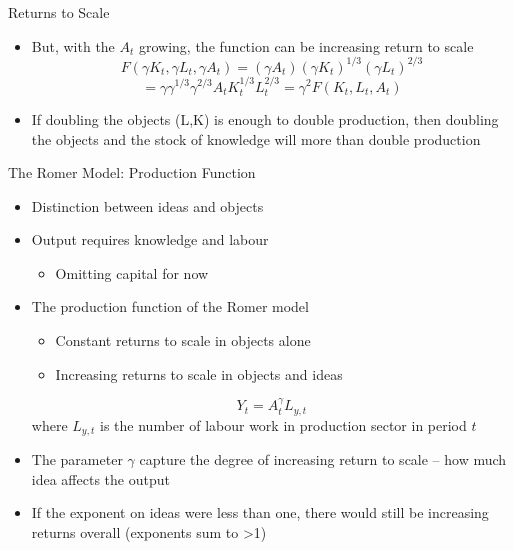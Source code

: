 \documentclass[aspectratio=1610]{beamer}
\begin{document}
\begin{frame}[wide]{Returns to Scale}
	\begin{itemize}
		\item But, with the $A_t$ growing, the function can be increasing return to scale
		\vspace{1mm}
		\[F(\gamma K_t,\gamma L_t, \gamma A_t) = (\gamma A_t) (\gamma K_t)^{1/3} (\gamma L_t)^{2/3}\]
		\[ = \gamma \gamma^{1/3} \gamma^{2/3} A_tK_t^{1/3}L_t^{2/3} = \gamma^2 F(K_t,L_t, A_t)  \]
		\vspace{1mm}
		\item If doubling the objects (L,K) is enough to double production, then doubling the objects and the stock of knowledge will more than double production
	\end{itemize}
\end{frame}

\begin{frame}[wide]{The Romer Model: Production Function}
	\begin{itemize}
		\item Distinction between ideas and objects
		\item Output requires knowledge and labour
		\begin{itemize}
			\item Omitting capital for now
		\end{itemize}
		\item The production function of the Romer model
		\begin{itemize}
			\item Constant returns to scale in objects alone
			\item Increasing returns to scale in objects and ideas
		\end{itemize}
		\vspace{2mm}
		\[Y_t = 		A_t^\gamma L_{y,t}\]
		where $L_{y,t}$ is the number of labour work in production sector in period $t$
		\item The parameter $\gamma$ capture the degree of increasing return to scale -- how much idea affects the output
		\item If the exponent on ideas were less than one, there would still be increasing returns overall (exponents sum to >1)
	\end{itemize}
\end{frame}
\end{document}
